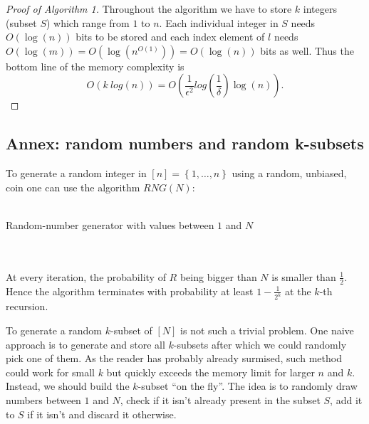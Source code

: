 \documentclass[10pt,usenames,dvipsnames]{article}
\newenvironment{exercise}[2][Exercise]{\begin{trivlist}
  \item[\hskip \labelsep {\bfseries #1}\hskip \labelsep {\bfseries #2.}]}{\end{trivlist}}
\begin{document}
\begin{exercise}{1}
\begin{proof}[Proof of Algorithm 1]
Throughout the algorithm we have to store $k$ integers (subset $S$) which
range from $1$ to $n$. Each individual integer in $S$ needs $O(\log(n))$ bits to be
stored and each index element of $l$ needs $O(\log(m)) = O(\log(n^{O(1)})) =
O(\log(n))$ bits as well. Thus the bottom line of the memory complexity is
\begin{equation}
  O(k\ log(n)) = O\left(\frac{1}{\epsilon^2} log\left(\frac{1}{\delta}\right) \log(n)\right).
\end{equation}
\end{proof}

\subsection*{Annex: random numbers and random k-subsets}

To generate a random integer in $[n] = \left\{ 1, \ldots, n \right\}$ using a
random, unbiased, coin one can use the algorithm $RNG(N)$:
\\ \\
\begin{algorithm}[H]
\SetAlgoLined


 \caption{Random-number generator with values between $1$ and $N$}
 \label{alg:algorithm2}
\end{algorithm}\mbox{}
 \\ \\
 At every iteration, the probability of $R$ being bigger than $N$ is smaller
 than $\frac{1}{2}$. Hence the algorithm terminates with probability at least $1 -
 \frac{1}{2^k}$ at the $k$-th recursion.

 To generate a random $k$-subset of $[N]$ is not such a trivial problem.
 One naive approach is to generate and store all $k$-subsets after which we
 could randomly pick one of them. As the reader has probably already surmised,
 such method could work for small $k$ but quickly exceeds the memory limit for
 larger $n$ and $k$. Instead, we should build the $k$-subset ``on the fly''. The
 idea is to randomly draw numbers between $1$ and $N$, check if it isn't already
 present in the subset $S$, add it to $S$ if it isn't and discard it otherwise.
 \\ \\
\begin{algorithm}[H]
\SetAlgoLined


\end{algorithm}
\end{exercise}
\end{document}
